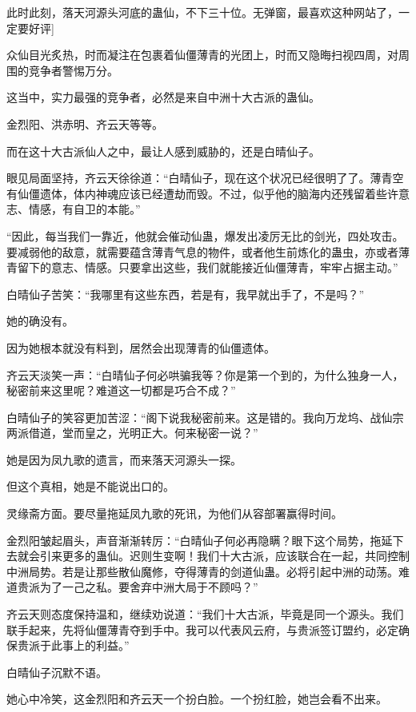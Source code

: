 
\begin{this_body}

此时此刻，落天河源头河底的蛊仙，不下三十位。无弹窗，最喜欢这种网站了，一定要好评]

众仙目光炙热，时而凝注在包裹着仙僵薄青的光团上，时而又隐晦扫视四周，对周围的竞争者警惕万分。

这当中，实力最强的竞争者，必然是来自中洲十大古派的蛊仙。

金烈阳、洪赤明、齐云天等等。

而在这十大古派仙人之中，最让人感到威胁的，还是白晴仙子。

眼见局面坚持，齐云天徐徐道：“白晴仙子，现在这个状况已经很明了了。薄青空有仙僵遗体，体内神魂应该已经遭劫而毁。不过，似乎他的脑海内还残留着些许意志、情感，有自卫的本能。”

“因此，每当我们一靠近，他就会催动仙蛊，爆发出凌厉无比的剑光，四处攻击。要减弱他的敌意，就需要蕴含薄青气息的物件，或者他生前炼化的蛊虫，亦或者薄青留下的意志、情感。只要拿出这些，我们就能接近仙僵薄青，牢牢占据主动。”

白晴仙子苦笑：“我哪里有这些东西，若是有，我早就出手了，不是吗？”

她的确没有。

因为她根本就没有料到，居然会出现薄青的仙僵遗体。

齐云天淡笑一声：“白晴仙子何必哄骗我等？你是第一个到的，为什么独身一人，秘密前来这里呢？难道这一切都是巧合不成？”

白晴仙子的笑容更加苦涩：“阁下说我秘密前来。这是错的。我向万龙坞、战仙宗两派借道，堂而皇之，光明正大。何来秘密一说？”

她是因为凤九歌的遗言，而来落天河源头一探。

但这个真相，她是不能说出口的。

灵缘斋方面。要尽量拖延凤九歌的死讯，为他们从容部署赢得时间。

金烈阳皱起眉头，声音渐渐转厉：“白晴仙子何必再隐瞒？眼下这个局势，拖延下去就会引来更多的蛊仙。迟则生变啊！我们十大古派，应该联合在一起，共同控制中洲局势。若是让那些散仙魔修，夺得薄青的剑道仙蛊。必将引起中洲的动荡。难道贵派为了一己之私。要舍弃中洲大局于不顾吗？”

齐云天则态度保持温和，继续劝说道：“我们十大古派，毕竟是同一个源头。我们联手起来，先将仙僵薄青夺到手中。我可以代表风云府，与贵派签订盟约，必定确保贵派于此事上的利益。”

白晴仙子沉默不语。

她心中冷笑，这金烈阳和齐云天一个扮白脸。一个扮红脸，她岂会看不出来。


\end{this_body}
